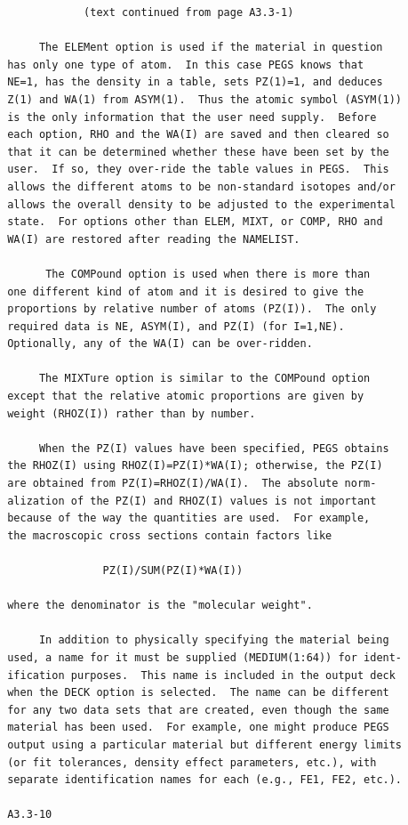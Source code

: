 \newpage {} \begin{verbatim}
             (text continued from page A3.3-1)

      The ELEMent option is used if the material in question
 has only one type of atom.  In this case PEGS knows that
 NE=1, has the density in a table, sets PZ(1)=1, and deduces
 Z(1) and WA(1) from ASYM(1).  Thus the atomic symbol (ASYM(1))
 is the only information that the user need supply.  Before
 each option, RHO and the WA(I) are saved and then cleared so
 that it can be determined whether these have been set by the
 user.  If so, they over-ride the table values in PEGS.  This
 allows the different atoms to be non-standard isotopes and/or
 allows the overall density to be adjusted to the experimental
 state.  For options other than ELEM, MIXT, or COMP, RHO and
 WA(I) are restored after reading the NAMELIST.

       The COMPound option is used when there is more than
 one different kind of atom and it is desired to give the
 proportions by relative number of atoms (PZ(I)).  The only
 required data is NE, ASYM(I), and PZ(I) (for I=1,NE).
 Optionally, any of the WA(I) can be over-ridden.

      The MIXTure option is similar to the COMPound option
 except that the relative atomic proportions are given by
 weight (RHOZ(I)) rather than by number.

      When the PZ(I) values have been specified, PEGS obtains
 the RHOZ(I) using RHOZ(I)=PZ(I)*WA(I); otherwise, the PZ(I)
 are obtained from PZ(I)=RHOZ(I)/WA(I).  The absolute norm-
 alization of the PZ(I) and RHOZ(I) values is not important
 because of the way the quantities are used.  For example,
 the macroscopic cross sections contain factors like

                PZ(I)/SUM(PZ(I)*WA(I))

 where the denominator is the "molecular weight".

      In addition to physically specifying the material being
 used, a name for it must be supplied (MEDIUM(1:64)) for ident-
 ification purposes.  This name is included in the output deck
 when the DECK option is selected.  The name can be different
 for any two data sets that are created, even though the same
 material has been used.  For example, one might produce PEGS
 output using a particular material but different energy limits
 (or fit tolerances, density effect parameters, etc.), with
 separate identification names for each (e.g., FE1, FE2, etc.).

 A3.3-10
\end{verbatim}

